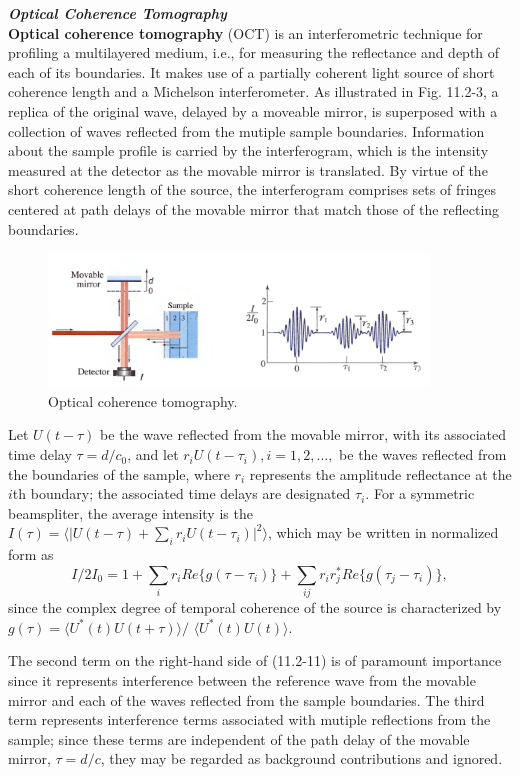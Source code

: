 \documentclass{article}
\numberwithin{figure}{subsection}
\numberwithin{table}{subsection}
\begin{document}
\bigbreak\noindent\textcolor{ksc}{\textbf{\textsl{Optical Coherence Tomography}}}\\
\textbf{Optical coherence tomography} (OCT) is an interferometric technique for profiling a multilayered medium, i.e., for measuring the reflectance and depth of each of its boundaries. It makes use of a partially coherent light source of short coherence length and a Michelson interferometer. As illustrated in Fig. 11.2-3, a replica of the original wave, delayed by a moveable mirror, is superposed with a collection of waves reflected from the mutiple sample boundaries. Information about the sample profile is carried by the interferogram, which is the intensity measured at the detector as the movable mirror is translated. By virtue of the short coherence length of the source, the interferogram comprises sets of fringes centered at path delays of the movable mirror that match those of the reflecting boundaries.
 \begin{figure}[H]
\centering
\includegraphics[width=0.9\textwidth]{11_2_3.PNG}
\caption{Optical coherence tomography.}
\label{fig: 11_2_3}
\end{figure}
\par Let $ U(t - \tau) $ be the wave reflected from the movable mirror, with its associated time delay $ \tau = d / c_0 $, and let $ r_i U(t - \tau_i), i = 1, 2, ..., $ be the waves reflected from the boundaries of the sample, where  $ r_i $ represents the amplitude reflectance at the $i$th boundary; the associated time delays are designated $ \tau_i $. For a symmetric beamspliter, the average intensity is the $ I(\tau) = \langle \lvert U(t - \tau) + \sum_i r_i U(t - \tau_i) \rvert ^2 \rangle $, which may be written in normalized form as 
\begin{equation}
I / 2I_0 = 1 + \sum_i r_i Re\{g(\tau - \tau_i)\} + \sum_{ij} r_i r_j^\ast Re\{g(\tau_j - \tau_i)\} ,
\end{equation}
since the complex degree of temporal coherence of the source is characterized by $ g(\tau) = \langle U^\ast (t) U(t + \tau)\rangle /$ $ \langle U^\ast (t) U(t) \rangle $.
\par The second term on the right-hand side of (11.2-11) is of paramount importance since it represents interference between the reference wave from the movable mirror and each of the waves reflected from the sample boundaries. The third term represents interference terms associated with mutiple reflections from the sample; since these terms are independent of the path delay of the movable mirror, $ \tau = d / c $, they may be regarded as background contributions and ignored.
\end{document}
